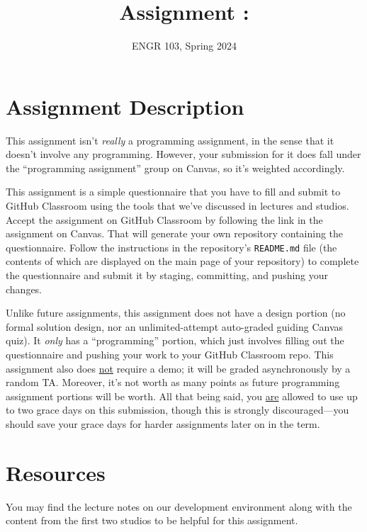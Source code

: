 \documentclass{article}
\title{
    Assignment \assignmentnumber: \assignmenttitle
}
\author{ENGR 103, Spring 2024}
\date{}
\begin{document}
\maketitle

\section{Assignment Description}

This assignment isn't \textit{really} a programming assignment, in the sense that it doesn't involve any programming. However, your submission for it does fall under the ``programming assignment'' group on Canvas, so it's weighted accordingly.

This assignment is a simple questionnaire that you have to fill and submit to GitHub Classroom using the tools that we've discussed in lectures and studios. Accept the assignment on GitHub Classroom by following the link in the assignment on Canvas. That will generate your own repository containing the questionnaire. Follow the instructions in the repository's \texttt{README.md} file (the contents of which are displayed on the main page of your repository) to complete the questionnaire and submit it by staging, committing, and pushing your changes.

Unlike future assignments, this assignment does not have a design portion (no formal solution design, nor an unlimited-attempt auto-graded guiding Canvas quiz). It \textit{only} has a ``programming'' portion, which just involves filling out the questionnaire and pushing your work to your GitHub Classroom repo. This assignment also does \ul{not} require a demo; it will be graded asynchronously by a random TA. Moreover, it's not worth as many points as future programming assignment portions will be worth. All that being said, you \ul{are} allowed to use up to two grace days on this submission, though this is strongly discouraged---you should save your grace days for harder assignments later on in the term.

\section{Resources}

You may find the lecture notes on our development environment along with the content from the first two studios to be helpful for this assignment.
\end{document}
